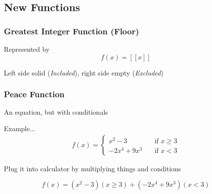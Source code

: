 \documentclass[twocolumn]{article}
\begin{document}
   	
   	\subsection{New Functions}
   	
   	\subsubsection{Greatest Integer Function (Floor)}
    Represented by
    \begin{equation*}
    	f(x) = [[x]]
    \end{equation*}
   	
   	Left side solid (\emph{Included}), right side empty (\emph{Excluded})
   	
   	\subsubsection{Peace Function}
   	\par An equation, but with conditionals
   	
   	Example...
   	\begin{align*}
	   	f(x) = 
	   	\begin{cases}
	   		x^2 - 3      &\quad \text{if } x \ge 3 \\
	   		-2x^4 + 9x^3 &\quad \text{if } x < 3
	   	\end{cases}
   \end{align*}
 
 		Plug it into calculator by multiplying things and conditions
 		
 		\begin{equation*}
 			f(x) = (x^2 - 3)(x \ge 3) + (-2x^4 + 9x^3)(x < 3)
 		\end{equation*}
\end{document}
